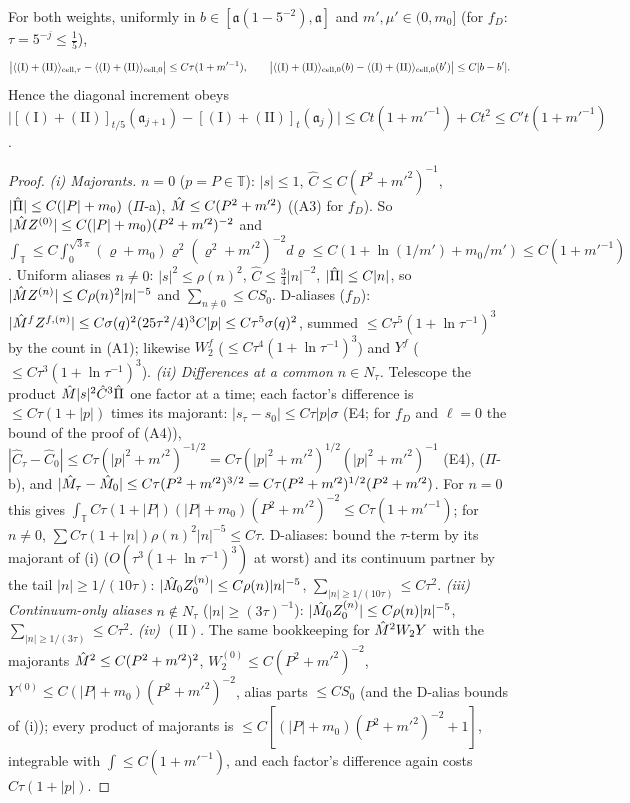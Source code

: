 \begin{theorem}\label{app:a04:thm:R}
For both weights, uniformly in $b\in[\mathfrak a(1-5^{-2}),\mathfrak a]$ and $m',\mu'\in(0,m_0]$ (for $f_D$: $\tau=5^{-j}\le\frac15$),
\[
\big|\langle(\mathrm I)+(\mathrm{II})\rangle_{\mathrm{cell},\tau}-\langle(\mathrm I)+(\mathrm{II})\rangle_{\mathrm{cell},0}\big|\le C\tau(1+m'^{-1}),\qquad
\big|\langle(\mathrm I)+(\mathrm{II})\rangle_{\mathrm{cell},0}(b)-\langle(\mathrm I)+(\mathrm{II})\rangle_{\mathrm{cell},0}(b')\big|\le C|b-b'|.
\]
Hence the diagonal increment obeys $\big|[(\mathrm I)+(\mathrm{II})]_{t/5}(\mathfrak a_{j+1})-[(\mathrm I)+(\mathrm{II})]_t(\mathfrak a_j)\big|\le Ct(1+m'^{-1})+Ct^2\le C't(1+m'^{-1})$.
\end{theorem}
\begin{proof}
\emph{(i) Majorants.} $n=0$ ($p=P\in\mathbb T$): $|s|\le1$, $\hat C\le C(P^2+m'^2)^{-1}$, $|\hat\Pi|\le C(|P|+m_0)$ ($\Pi$-a), $\hat M\le C(P^2+m'^2)$ ((A3) for $f_D$). So $|\hat M Z^{(0)}|\le C(|P|+m_0)(P^2+m'^2)^{-2}$ and $\int_{\mathbb T}\le C\int_0^{\sqrt3\pi}(\varrho+m_0)\varrho^2(\varrho^2+m'^2)^{-2}d\varrho\le C(1+\ln(1/m')+m_0/m')\le C(1+m'^{-1})$. Uniform aliases $n\ne0$: $|s|^2\le\rho(n)^2$, $\hat C\le\frac34|n|^{-2}$, $|\hat\Pi|\le C|n|$, so $|\hat M Z^{(n)}|\le C\rho(n)^2|n|^{-5}$ and $\sum_{n\ne0}\le CS_0$. D-aliases ($f_D$): $|\hat M^fZ^{f,(n)}|\le C\sigma(q)^2(25\tau^2/4)^3C|p|\le C\tau^5\sigma(q)^2$, summed $\le C\tau^5(1+\ln\tau^{-1})^3$ by the count in (A1); likewise $W^f_2$ ($\le C\tau^4(1+\ln\tau^{-1})^3$) and $Y^f$ ($\le C\tau^3(1+\ln\tau^{-1})^3$).
\emph{(ii) Differences at a common $n\in N_\tau$.} Telescope the product $\hat M|s|^2\hat C^3\hat\Pi$ one factor at a time; each factor's difference is $\le C\tau(1+|p|)$ times its majorant: $|s_\tau-s_0|\le C\tau|p|\sigma$ (E4; for $f_D$ and $\ell=0$ the bound of the proof of (A4)), $|\hat C_\tau-\hat C_0|\le C\tau(|p|^2+m'^2)^{-1/2}=C\tau(|p|^2+m'^2)^{1/2}(|p|^2+m'^2)^{-1}$ (E4), ($\Pi$-b), and $|\hat M_\tau-\hat M_0|\le C\tau(P^2+m'^2)^{3/2}=C\tau(P^2+m'^2)^{1/2}(P^2+m'^2)$. For $n=0$ this gives $\int_{\mathbb T}C\tau(1+|P|)(|P|+m_0)(P^2+m'^2)^{-2}\le C\tau(1+m'^{-1})$; for $n\ne0$, $\sum C\tau(1+|n|)\rho(n)^2|n|^{-5}\le C\tau$. D-aliases: bound the $\tau$-term by its majorant of (i) ($O(\tau^3(1+\ln\tau^{-1})^3)$ at worst) and its continuum partner by the tail $|n|\ge1/(10\tau)$: $|\hat M_0Z_0^{(n)}|\le C\rho(n)|n|^{-5}$, $\sum_{|n|\ge1/(10\tau)}\le C\tau^2$.
\emph{(iii) Continuum-only aliases} $n\notin N_\tau$ ($|n|\ge(3\tau)^{-1}$): $|\hat M_0Z_0^{(n)}|\le C\rho(n)|n|^{-5}$, $\sum_{|n|\ge1/(3\tau)}\le C\tau^2$.
\emph{(iv) $(\mathrm{II})$.} The same bookkeeping for $\hat M^2W_2Y$ with the majorants $\hat M^2\le C(P^2+m'^2)^2$, $W_2^{(0)}\le C(P^2+m'^2)^{-2}$, $Y^{(0)}\le C(|P|+m_0)(P^2+m'^2)^{-2}$, alias parts $\le CS_0$ (and the D-alias bounds of (i)); every product of majorants is $\le C[(|P|+m_0)(P^2+m'^2)^{-2}+1]$, integrable with $\int\le C(1+m'^{-1})$, and each factor's difference again costs $C\tau(1+|p|)$.

\end{proof}
